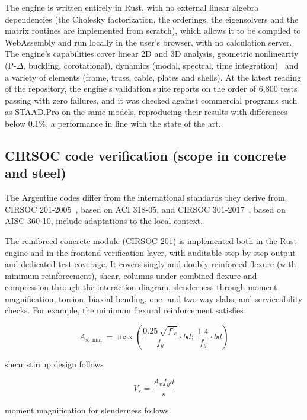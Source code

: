 \documentclass[11pt,a4paper]{article}
\begin{document}
The engine is written entirely in Rust, with no external linear algebra dependencies (the Cholesky factorization, the orderings, the eigensolvers and the matrix routines are implemented from scratch), which allows it to be compiled to WebAssembly and run locally in the user's browser, with no calculation server. The engine's capabilities cover linear 2D and 3D analysis, geometric nonlinearity (P-$\Delta$, buckling, corotational), dynamics (modal, spectral, time integration)~\cite{ref18} and a variety of elements (frame, truss, cable, plates and shells). At the latest reading of the repository, the engine's validation suite reports on the order of 6,800 tests passing with zero failures, and it was checked against commercial programs such as STAAD.Pro on the same models, reproducing their results with differences below 0.1\%, a performance in line with the state of the art.

\subsection{CIRSOC code verification (scope in concrete and steel)}\label{sec:5.2}

The Argentine codes differ from the international standards they derive from. CIRSOC 201-2005~\cite{ref9}, based on ACI 318-05, and CIRSOC 301-2017~\cite{ref10}, based on AISC 360-10, include adaptations to the local context.

The reinforced concrete module (CIRSOC 201) is implemented both in the Rust engine and in the frontend verification layer, with auditable step-by-step output and dedicated test coverage. It covers singly and doubly reinforced flexure (with minimum reinforcement), shear, columns under combined flexure and compression through the interaction diagram, slenderness through moment magnification, torsion, biaxial bending, one- and two-way slabs, and serviceability checks. For example, the minimum flexural reinforcement satisfies

\begin{equation}
  A_{s,\min} = \max\left(\frac{0.25\,\sqrt{f'_c}}{f_y}\cdot b d;\; \frac{1.4}{f_y}\cdot b d\right)
  \label{eq:1}
\end{equation}

shear stirrup design follows

\begin{equation}
  V_s = \frac{A_v f_y d}{s}
  \label{eq:2}
\end{equation}

moment magnification for slenderness follows
\end{document}
